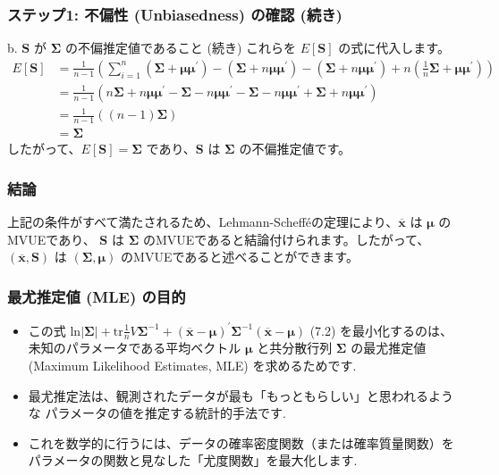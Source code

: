 \documentclass[aspectratio=169]{beamer}
\begin{document}
\begin{frame}
\frametitle{ステップ1: 不偏性 (Unbiasedness) の確認 (続き)}
\begin{block}{b. $\bm{S}$ が $\bm{\Sigma}$ の不偏推定値であること (続き)}
これらを $E[\bm{S}]$ の式に代入します。
\begin{align*}
E[\bm{S}] &= \frac{1}{n-1}\left(\sum_{i=1}^{n}(\bm{\Sigma}+\bm{\mu}\bm{\mu}^{\prime})-(\bm{\Sigma}+n\bm{\mu}\bm{\mu}^{\prime})-(\bm{\Sigma}+n\bm{\mu}\bm{\mu}^{\prime})+n(\frac{1}{n}\bm{\Sigma}+\bm{\mu}\bm{\mu}^{\prime})\right) \\
&= \frac{1}{n-1}\left(n\bm{\Sigma}+n\bm{\mu}\bm{\mu}^{\prime}-\bm{\Sigma}-n\bm{\mu}\bm{\mu}^{\prime}-\bm{\Sigma}-n\bm{\mu}\bm{\mu}^{\prime}+\bm{\Sigma}+n\bm{\mu}\bm{\mu}^{\prime}\right) \\
&= \frac{1}{n-1}((n-1)\bm{\Sigma}) \\
&= \bm{\Sigma}
\end{align*}
したがって、$E[\bm{S}]=\bm{\Sigma}$ であり、$\bm{S}$ は $\bm{\Sigma}$ の不偏推定値です。
\end{block}
\end{frame}


\begin{frame}
\frametitle{結論}
\begin{block}{}
上記の条件がすべて満たされるため、Lehmann-Schefféの定理により、$\overline{\bm{x}}$ は $\bm{\mu}$ のMVUEであり、 $\bm{S}$ は $\bm{\Sigma}$ のMVUEであると結論付けられます。したがって、$(\overline{\bm{x}},\bm{S})$ は $(\bm{\Sigma},\bm{\mu})$ のMVUEであると述べることができます。
\end{block}
\end{frame}

\begin{frame}
\frametitle{最尤推定値 (MLE) の目的}
\begin{itemize}
    \item この式 $\text{ln}|\bm{\Sigma}|+\text{tr}\frac{1}{n}V\bm{\Sigma}^{-1}+(\overline{\bm{x}}-\bm{\mu})^{\prime}\bm{\Sigma}^{-1}(\overline{\bm{x}}-\bm{\mu})$ (7.2) を最小化するのは、未知のパラメータである平均ベクトル $\bm{\mu}$ と共分散行列 $\bm{\Sigma}$ の最尤推定値 (Maximum Likelihood Estimates, MLE) を求めるためです.
    \item 最尤推定法は、観測されたデータが最も「もっともらしい」と思われるような
    パラメータの値を推定する統計的手法です.
    \item これを数学的に行うには、データの確率密度関数（または確率質量関数）を
    パラメータの関数と見なした「尤度関数」を最大化します.
\end{itemize}
\end{frame}
\end{document}
